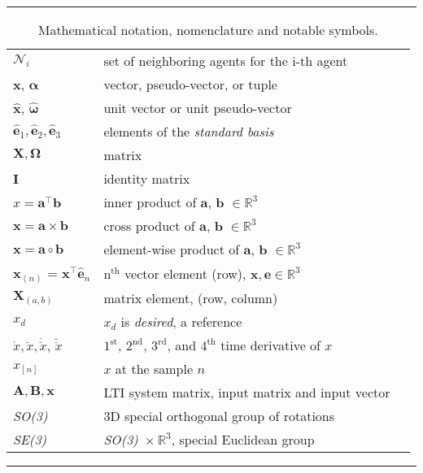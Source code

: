 \begin{table*}[!h]
  \scriptsize
  \centering
  \noindent\rule{\textwidth}{0.5pt}
  \begin{tabular}{lll}
    $\mathcal{N}_i$ & set of neighboring agents for the i-th agent\\



    $\mathbf{x}$, $\bm{\alpha}$ & vector, pseudo-vector, or tuple\\
    $\mathbf{\hat{x}}$, $\bm{\hat{\omega}}$& unit vector or unit pseudo-vector\\
    $\mathbf{\hat{e}}_1, \mathbf{\hat{e}}_2, \mathbf{\hat{e}}_3$ & elements of the \emph{standard basis} \\
    $\mathbf{X}, \bm{\Omega}$ & matrix \\
    $\mathbf{I}$ & identity matrix \\
    $x = \mathbf{a}^\intercal\mathbf{b}$ & inner product of $\mathbf{a}$, $\mathbf{b}$ $\in \mathbb{R}^3$\\
    $\mathbf{x} = \mathbf{a}\times\mathbf{b}$ & cross product of $\mathbf{a}$, $\mathbf{b}$ $\in \mathbb{R}^3$\\
    $\mathbf{x} = \mathbf{a}\circ\mathbf{b}$ & element-wise product of $\mathbf{a}$, $\mathbf{b}$ $\in \mathbb{R}^3$ \\
    $\mathbf{x}_{(n)}$ = $\mathbf{x}^\intercal\mathbf{\hat{e}}_n$ & $\mathrm{n}^{\mathrm{th}}$ vector element (row), $\mathbf{x}, \mathbf{e} \in \mathbb{R}^3$\\
    $\mathbf{X}_{(a,b)}$ & matrix element, (row, column)\\
    $x_{d}$ & $x_d$ is \emph{desired}, a reference\\
    $\dot{x}, \ddot{x}, \dot{\ddot{x}}$, $\ddot{\ddot{x}}$ & ${1^{\mathrm{st}}}$, ${2^{\mathrm{nd}}}$, ${3^{\mathrm{rd}}}$, and ${4^{\mathrm{th}}}$ time derivative of $x$\\
    $x_{[n]}$ & $x$ at the sample $n$ \\
    $\mathbf{A}, \mathbf{B}, \mathbf{x}$ & LTI system matrix, input matrix and input vector\\
    \emph{SO(3)} & 3D special orthogonal group of rotations\\
    \emph{SE(3)} & \emph{SO(3)}~$\times~\mathbb{R}^3$, special Euclidean group\\
  \end{tabular}
  \noindent\rule{\textwidth}{0.5pt}
  \caption{Mathematical notation, nomenclature and notable symbols.}
  \label{tab:mathematical_notation}
\end{table*}

